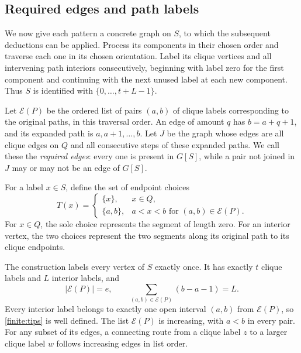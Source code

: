 \subsection{Required edges and path labels}

We now give each pattern a concrete graph on $S$, to which the
subsequent deductions can be applied.  Process its components in
their chosen order and traverse each one in its chosen orientation.
Label its clique vertices and all intervening path interiors
consecutively, beginning with label zero for the first component and
continuing with the next unused label at each new component.
Thus $S$ is identified with $\{0,\ldots,t+L-1\}$.

Let $\mathcal E(P)$ be the ordered list of pairs $(a,b)$ of clique
labels corresponding to the original paths, in this traversal order.
An edge of amount $q$ has $b=a+q+1$, and its expanded path is
$a,a+1,\ldots,b$.  Let $J$ be the graph whose edges are all clique
edges on $Q$ and all consecutive steps of these expanded paths.
We call these the \emph{required edges}: every one is present in
$G[S]$, while a pair not joined in $J$ may or may not be an edge
of $G[S]$.

For a label $x\in S$, define the set of endpoint choices
\begin{equation}\label{finite:tips}
 T(x)=
 \begin{cases}
  \{x\},&x\in Q,\\
  \{a,b\},&a<x<b\text{ for }(a,b)\in\mathcal E(P).
 \end{cases}
\end{equation}
For $x\in Q$, the sole choice represents the segment of length zero.
For an interior vertex, the two choices represent the two segments
along its original path to its clique endpoints.

\begin{lemma}\label{finite:labels}
The construction labels every vertex of $S$ exactly once.  It has
exactly $t$ clique labels and $L$ interior labels, and
\[
 |\mathcal E(P)|=e,\qquad
 \sum_{(a,b)\in\mathcal E(P)}(b-a-1)=L.
\]
Every interior label belongs to exactly one open interval $(a,b)$
from $\mathcal E(P)$, so \eqref{finite:tips} is well defined.
The list $\mathcal E(P)$ is increasing, with $a<b$ in every pair.
For any subset of its edges, a connecting route from a clique label
$z$ to a larger clique label $w$ follows increasing edges in list order.
\end{lemma}


